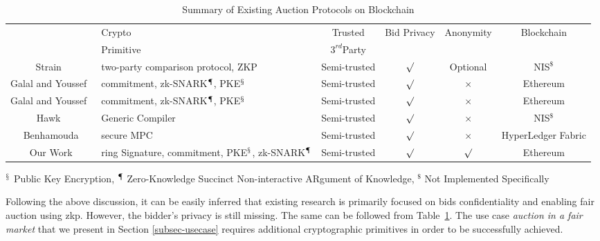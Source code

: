        

\begin{table}[h!]
\centering
\begin{tabular}{cp{3.7cm}cccc}
    
             & Crypto & Trusted & Bid Privacy & Anonymity & Blockchain\\
             & Primitive & $3^{rd}$Party & & & \\
        \hline
        Strain~\cite{blass2018strain} & two-party comparison protocol, ZKP  & Semi-trusted & $\surd$ & Optional & NIS$^{\$}$\\
        \hline
        Galal and Youssef~\cite{galal2018verifiable} & commitment, zk-SNARK$^{\mathparagraph}$, PKE$^{\mathsection}$ & Semi-trusted & $\surd$ & $\times$ & Ethereum\\
        \hline
        Galal and Youssef~\cite{galal2018succinctly} & commitment, zk-SNARK$^{\mathparagraph}$, PKE$^{\mathsection}$ & Semi-trusted & $\surd$ & $\times$ & Ethereum\\
        \hline
        Hawk~\cite{kosba2016hawk} & Generic Compiler & Semi-trusted & $\surd$ & $\times$ & NIS$^{\$}$\\
        \hline
        Benhamouda\cite{benhamouda2019supporting} & secure MPC & Semi-trusted & $\surd$ & $\times$ & HyperLedger Fabric\\
        \hline
        Our Work & ring Signature, commitment, PKE$^{\mathsection}$, zk-SNARK$^{\mathparagraph}$ & Semi-trusted & $\surd$ & $\surd$ & Ethereum\\
        \hline
\end{tabular}
\begin{tablenotes}
\item $^{\mathsection}$ Public Key Encryption, $^{\mathparagraph}$ Zero-Knowledge Succinct Non-interactive ARgument of Knowledge, $^{\$}$ Not Implemented Specifically 
\end{tablenotes}
\caption{Summary of Existing Auction Protocols on Blockchain}
 \label{Tab:1}
 \end{table}

Following the above discussion, it can be easily inferred that existing research is primarily focused on bids confidentiality and enabling fair auction using \gls{zkp}. However, the bidder's privacy is still missing. The same can be followed from Table~\ref{Tab:1}. The use case \textit{auction in a fair market} that we present in Section \ref{subsec-usecase} requires additional cryptographic primitives in order to be successfully achieved.


